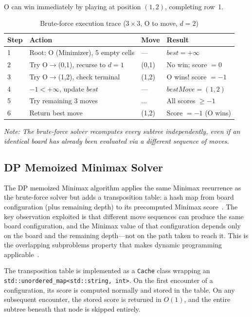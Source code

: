 \documentclass[conference]{IEEEtran}
\begin{document}
O can win immediately by playing at position $(1,2)$, completing row~1.

\begin{table}[htbp]
\centering
\caption{Brute-force execution trace ($3 \times 3$, O to move, $d=2$)}
\label{tab:bf_trace}
\renewcommand{\arraystretch}{2.0}
\begin{tabular}{|p{0.5cm}|p{2.5cm}|p{1.5cm}|p{2.2cm}|}
\hline
\textbf{Step} & \textbf{Action} & \textbf{Move} & \textbf{Result} \\
\hline
1 & Root: O (Minimizer), 5 empty cells & --- & $best = +\infty$ \\
\hline
2 & Try O$\to$(0,1), recurse to $d{=}1$ & (0,1) & No win; score $= 0$ \\
\hline
3 & Try O$\to$(1,2), check terminal & (1,2) & O wins! score $= -1$ \\
\hline
4 & $-1 < +\infty$, update $best$ & --- & $bestMove = (1,2)$ \\
\hline
5 & Try remaining 3 moves & ... & All scores $\geq -1$ \\
\hline
6 & Return best move & (1,2) & Score $= -1$ (O wins) \\
\hline
\end{tabular}
\end{table}

\textit{Note: The brute-force solver recomputes every subtree
independently, even if an identical board has already been evaluated via
a different sequence of moves.}

\subsection{DP Memoized Minimax Solver}
The DP memoized Minimax algorithm applies the same Minimax recurrence as
the brute-force solver but adds a transposition table: a hash map from
board configuration (plus remaining depth) to its precomputed Minimax
score~\cite{b4, b5}. The key observation exploited is that different move
sequences can produce the same board configuration, and the Minimax value
of that configuration depends only on the board and the remaining
depth---not on the path taken to reach it. This is the overlapping
subproblems property that makes dynamic programming applicable~\cite{b4}.

The transposition table is implemented as a \texttt{Cache} class wrapping
an \texttt{std::unordered\_map<std::string,\,int>}. On the first
encounter of a configuration, its score is computed normally and stored
in the table. On any subsequent encounter, the stored score is returned
in $O(1)$, and the entire subtree beneath that node is skipped entirely.
\end{document}
